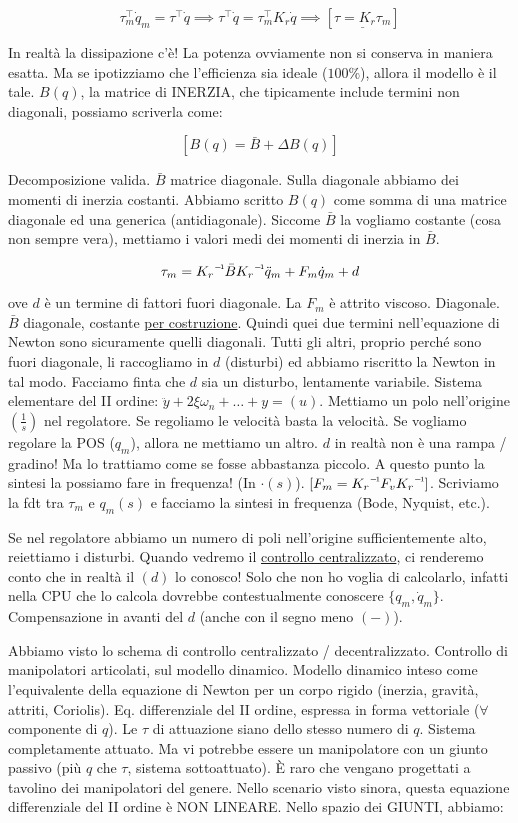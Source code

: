 \[	
	\tau_m^\top\dot{q}_m = \tau^\top\dot{q} \implies \tau^\top\dot{q} = \tau_m^\top K_r\dot{q} \implies [\underline{\tau=K_r\tau_m}]
\]

In realtà la dissipazione c'è! La potenza ovviamente non si conserva in maniera esatta. Ma se ipotizziamo che l'efficienza sia ideale ($100\%$), allora il modello è il tale. $B(q)$, la matrice di INERZIA, che tipicamente include termini non diagonali, possiamo scriverla come:

\[
	[B(q) = \bar{B} + \Delta B(q)]
\]

Decomposizione valida. $\bar{B}$ matrice diagonale. Sulla diagonale abbiamo dei momenti di inerzia costanti. Abbiamo scritto $B(q)$ come somma di una matrice diagonale ed una generica (antidiagonale). Siccome $\bar{B}$ la vogliamo costante (cosa non sempre vera), mettiamo i valori medi dei momenti di inerzia in $\bar{B}$. 

\[
	\tau_m = \inv{K_r}\bar{B}\inv{K_r}\ddot{q}_m + F_m\dot{q}_m + d
\]

ove $d$ è un termine di fattori fuori diagonale. La $F_m$ è attrito viscoso. Diagonale. $\bar{B}$ diagonale, costante \underline{per costruzione}. Quindi quei due termini nell'equazione di Newton sono sicuramente quelli diagonali. Tutti gli altri, proprio perché sono fuori diagonale, li raccogliamo in $d$ (disturbi) ed abbiamo riscritto la Newton in tal modo. Facciamo finta che $d$ sia un disturbo, lentamente variabile. Sistema elementare del II ordine: $\ddot{y} + 2\xi\omega_n + \dots + y = (u)$. Mettiamo un polo nell'origine $(\frac{1}{s})$ nel regolatore. Se regoliamo le velocità basta la velocità. Se vogliamo regolare la POS ($q_m$), allora ne mettiamo un altro. $d$ in realtà non è una rampa / gradino! Ma lo trattiamo come se fosse abbastanza piccolo. A questo punto la sintesi la possiamo fare in frequenza! (In $\mathord{\cdot}(s)$). $[F_m=\inv{K_r}F_v\inv{K_r}]$. Scriviamo la fdt tra $\tau_m$ e $q_m(s)$ e facciamo la sintesi in frequenza (Bode, Nyquist, etc.).

Se nel regolatore abbiamo un numero di poli nell'origine sufficientemente alto, reiettiamo i disturbi. Quando vedremo il \underline{controllo centralizzato}, ci renderemo conto che in realtà il $(d)$ lo conosco! Solo che non ho voglia di calcolarlo, infatti nella CPU che lo calcola dovrebbe contestualmente conoscere $\{q_m,\dot{q}_m\}$. Compensazione in avanti del $d$ (anche con il segno meno $(-)$).

Abbiamo visto lo schema di controllo centralizzato / decentralizzato. Controllo di manipolatori articolati, sul modello dinamico. Modello dinamico inteso come l'equivalente della equazione di Newton per un corpo rigido (inerzia, gravità, attriti, Coriolis). Eq. differenziale del II ordine, espressa in forma vettoriale ($\forall$ componente di $q$). Le $\tau$ di attuazione siano dello stesso numero di $q$. Sistema completamente attuato. Ma vi potrebbe essere un manipolatore con un giunto passivo (più $q$ che $\tau$, sistema sottoattuato). \`E raro che vengano progettati a tavolino dei manipolatori del genere. Nello scenario visto sinora, questa equazione differenziale del II ordine è NON LINEARE. Nello spazio dei GIUNTI, abbiamo:

